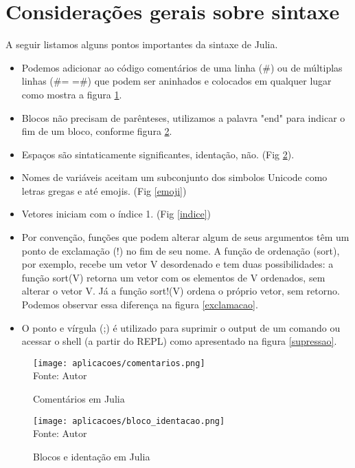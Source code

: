 \section{Considerações gerais sobre sintaxe}
A seguir listamos alguns pontos importantes da sintaxe de Julia. 
\begin{itemize}
    \item Podemos adicionar ao código comentários de uma linha (\#) ou de múltiplas linhas (\#= =\#) que podem ser aninhados e colocados em qualquer lugar como mostra a figura \ref{comentarios}.

    \item Blocos não precisam de parênteses, utilizamos a palavra "end" para indicar o fim de um bloco, conforme figura \ref{blocos_identacao}.
    \item Espaços são sintaticamente significantes, identação, não. (Fig \ref{blocos_identacao}).
    \item Nomes de variáveis aceitam um subconjunto dos simbolos Unicode como letras gregas e até emojis. (Fig \ref{emoji})
    \item Vetores iniciam com o índice 1. (Fig \ref{indice})
    \item Por convenção, funções que podem alterar algum de seus argumentos têm um ponto de exclamação (!) no fim de seu nome. A função de ordenação (sort), por exemplo, recebe um vetor V desordenado e tem duas possibilidades: a função sort(V) retorna um vetor com os elementos de V ordenados, sem alterar o vetor V. Já a função sort!(V) ordena o próprio vetor, sem retorno. Podemos observar essa diferença na figura \ref{exclamacao}.
    \item O ponto e vírgula (;) é utilizado para suprimir o output de um comando ou acessar o shell (a partir do REPL) como apresentado na figura \ref{supressao}.
    
  \end{itemize}
    
    \begin{figure}[H]%
    \begin{center}
        \label{comentarios}
        \caption{Comentários em Julia} 
        \texttt{[image: aplicacoes/comentarios.png]} \\
        {\tiny \sf Fonte: Autor}
    \end{center}
    \end{figure} 

    \begin{figure}[H]%
    \begin{center}
        \label{blocos_identacao}
        \caption{Blocos e identação em Julia} 
        \texttt{[image: aplicacoes/bloco\_identacao.png]} \\
        {\tiny \sf Fonte: Autor}
    \end{center}
    \end{figure} 

